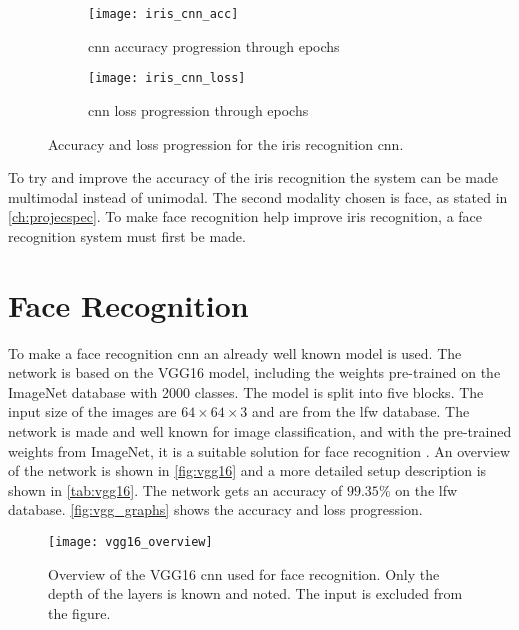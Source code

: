 \begin{figure}[H]
	\centering
	\begin{subfigure}{0.48\textwidth}
		\centering
		\texttt{[image: iris\_cnn\_acc]}
		\caption{\gls{cnn} accuracy progression through epochs}
		\label{fig:iris_cnn_acc}
	\end{subfigure}
	\begin{subfigure}{0.48\textwidth}
		\centering
		\texttt{[image: iris\_cnn\_loss]}
		\caption{\gls{cnn} loss progression through epochs}
		\label{fig:iris_cnn_loss}
	\end{subfigure}
	\caption{Accuracy and loss progression for the iris recognition \gls{cnn}.}
	\label{fig:iris_graphs}
\end{figure}

\noindent To try and improve the accuracy of the iris recognition the system can be made multimodal instead of unimodal. The second modality chosen is face, as stated in \autoref{ch:projecspec}. To make face recognition help improve iris recognition, a face recognition system must first be made.

\section{Face Recognition}
To make a face recognition \gls{cnn} an already well known model is used. The network is based on the VGG16 model, including the weights pre-trained on the ImageNet database with 2000 classes. The model is split into five blocks. The input size of the images are $64\times64\times3$ and are from the \gls{lfw} database. The network is made and well known for image classification, and with the pre-trained weights from ImageNet, it is a suitable solution for face recognition \citep{Simonyan2015}.
An overview of the network is shown in \autoref{fig:vgg16} and a more detailed setup description is shown in \autoref{tab:vgg16}. The network gets an accuracy of $99.35\%$ on the \gls{lfw} database. \autoref{fig:vgg_graphs} shows the accuracy and loss progression.

\begin{figure}[H]
	\centering
	\texttt{[image: vgg16\_overview]}
	\caption{Overview of the VGG16 \gls{cnn} used for face recognition. Only the depth of the layers is known and noted. The input is excluded from the figure.}
	\label{fig:vgg16}
\end{figure}

